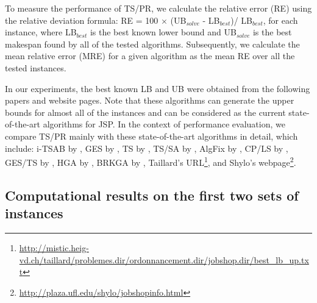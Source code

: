 \documentclass[authoryear,12pt]{elsarticle}
\begin{document}
To measure the performance of TS/PR, we calculate the relative error (RE) using the relative deviation formula: RE = 100 $\times$ (UB$_{solve}$ - LB$_{best}$)/ LB$_{best}$, for each instance, where LB$_{best}$ is the best known lower bound and UB$_{solve}$ is the best makespan found by all of the tested algorithms. Subsequently, we calculate the mean relative error (MRE) for a given algorithm as the mean RE over all the tested instances.

In our experiments, the best known LB and UB were obtained from the following papers and website pages. Note that these algorithms can generate the upper bounds for almost all of the instances and can be considered as the current state-of-the-art algorithms for JSP. In the context of performance evaluation, we compare TS/PR mainly with these state-of-the-art algorithms in detail, which include: i-TSAB by \cite{Nowicki2005i-TSAB},
GES by \cite{Pardalos2006GES}, TS by \cite{Zhang2007TS}, TS/SA by \cite{Zhang2008TSSA}, AlgFix by \cite{Pardalos2010AlgFix}, CP/LS by \cite{Beck2011CP/LS}, GES/TS by \cite{Nasiri2012GES/TS}, HGA by \cite{Qing-dao-er-ji2012HGA}, BRKGA by \cite{Goncalves2013BRKGA}, Taillard's URL\footnote{\url{http://mistic.heig-vd.ch/taillard/problemes.dir/ordonnancement.dir/jobshop.dir/best_lb_up.txt}}, and Shylo's webpage\footnote{\url{http://plaza.ufl.edu/shylo/jobshopinfo.html}}.

\subsection{Computational results on the first two sets of instances}

\label{subsec Computational Results 1}
\end{document}
